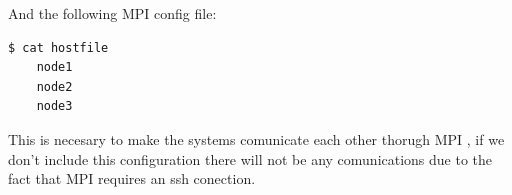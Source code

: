 And the following MPI config file:


\begin{lstlisting}[frame=single,language=bash]
  $ cat hostfile
    node1
    node2
    node3
\end{lstlisting}

This is necesary to make the systems comunicate each other thorugh MPI , if we
don't include this configuration there will not be any comunications due to the
fact that MPI requires an ssh conection. 


\clearpage
